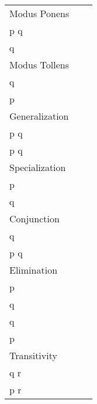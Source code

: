 \documentclass[main.tex]{subfiles}
\begin{document}
\begin{table}[h]
	\centering
	\begin{tabular}{lrr}
		\toprule
		Modus Ponens & & \(\begin{aligned} p \\ p \Rightarrow q \\ \therefore q \end{aligned}\) \\
		\midrule
		Modus Tollens & & \(\begin{aligned} p \Rightarrow q \\ \lnot q \\ \therefore \lnot p \end{aligned}\) \\
		\midrule
		Generalization & \(\begin{aligned} p \\ \therefore p \lor q \end{aligned}\) & \(\begin{aligned} q \\ \therefore p \lor q \end{aligned}\) \\
		\midrule
		Specialization & \(\begin{aligned} p \land q \\ \therefore p \end{aligned}\) & \(\begin{aligned} p \land q \\ \therefore q \end{aligned}\) \\
		\midrule
		Conjunction & & \(\begin{aligned} p \\ q \\ \therefore p \land q \end{aligned}\) \\
		\midrule
		Elimination & \(\begin{aligned} p \lor q \\ \lnot p \\ \therefore q \end{aligned}\) & \(\begin{aligned} p \lor q \\ \lnot q \\ \therefore p \end{aligned}\) \\
		\midrule
		Transitivity & & \(\begin{aligned} p \Rightarrow q \\ q \Rightarrow r \\ \therefore p \Rightarrow r \end{aligned}\) \\

\end{tabular}
\end{table}
\end{document}
